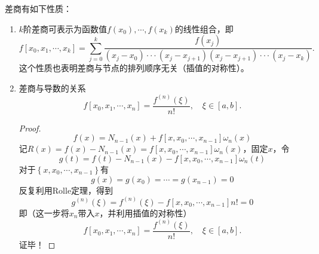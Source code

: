 \begin{note}
    差商有如下性质：
    \begin{enumerate}
        \item $k$阶差商可表示为函数值$f(x_{0}),\cdots,f(x_k)$的线性组合，即
        \[
            f[x_0,x_1,\cdots,x_k]=\sum\limits_{j=0}^k\frac{f(x_j)}{(x_j-x_0)\cdotp\cdotp\cdotp(x_j-x_{j+1})(x_j-x_{j+1})\cdotp\cdotp\cdotp(x_j-x_k)}.
        \]
        这个性质也表明差商与节点的排列顺序无关（插值的对称性）。
        \item 差商与导数的关系
        \begin{equation}\label{eq:MinusQution}
            f[x_0,x_1,\cdots,x_n]=\frac{f^{(n)}(\xi)}{n!},\quad\xi\in[a,b].
        \end{equation}
        \begin{proof}
            \[
                f(x) = N_{n-1}(x)+f\left[ x,x_0,\cdots,x_{n-1} \right]\omega_{n}(x)
            \]
            记$R(x) = f(x)-N_{n-1}(x) = f\left[ x,x_0,\cdots,x_{n-1} \right]\omega_{n}(x)$，固定$x$，令
            \[
                g(t) = f(t)-N_{n-1}(x)-f\left[ x,x_0,\cdots,x_{n-1} \right]\omega_{n}(t)
            \]
            对于$\left\{ x,x_0,\cdots,x_{n-1} \right\}$有
            \[
                g(x) = g(x_0) = \cdots = g(x_{n-1}) = 0    
            \]
            反复利用Rolle定理，得到
            \[
                g^{(n)}(\xi) = f^{(n)}(\xi)-f\left[ x,x_0,\cdots,x_{n-1} \right]n! = 0
            \]
            即（这一步将$x_n$带入$x$，并利用插值的对称性）
            \[
                f[x_0,x_1,\cdots,x_n]=\frac{f^{(n)}(\xi)}{n!},\quad\xi\in[a,b].
            \]
            证毕！
        \end{proof}
    \end{enumerate}
\end{note}
